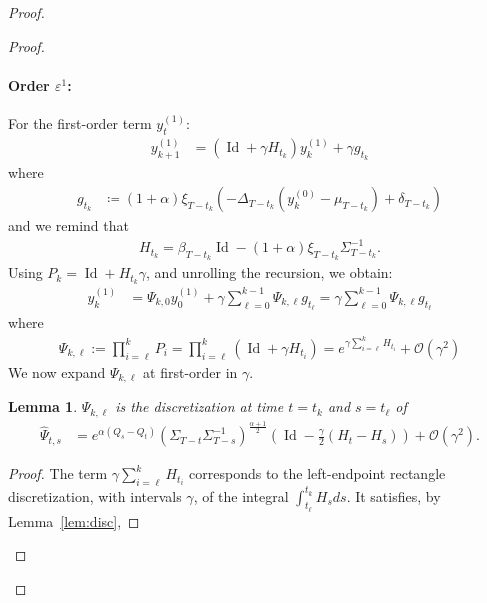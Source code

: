 \documentclass[11pt]{article}
\newtheorem{lem}{Lemma}
\newcommand{\eqdef}{\coloneqq}
\newcommand{\id}{\operatorname{Id}}
\begin{document}
\begin{proof}
\begin{proof}
\paragraph{Order \(\varepsilon^1\):} For the first-order term $y^{(1)}_t$:
\begin{align*}
y^{(1)}_{k+1} %
&= (\id + \gamma H_{t_k}) y^{(1)}_k + \gamma g_{t_k}
\end{align*}
where 
\begin{align*}
g_{t_k} %
&\eqdef (1 + \alpha) \xi_{T-t_k}( - \Delta_{T-t_k} (y^{(0)}_k - \mu_{T-t_k}) +  \delta_{T-t_k})
\end{align*}
and we remind that 
\begin{align*}
     H_{t_k} = \beta_{T-t_k}\id - (1 + \alpha) \xi_{T-t_k} \Sigma_{T-t_k}^{-1}.
\end{align*}
Using  $P_k = \id + H_{t_k} \gamma$, and unrolling the recursion, we obtain:
\begin{align*}
    y^{(1)}_k &= \Psi_{k,0} y^{(1)}_0 + \gamma \sum_{\ell=0}^{k-1} \Psi_{k,\ell} g_{t_\ell} = \gamma \sum_{\ell=0}^{k-1} \Psi_{k,\ell} g_{t_\ell}
\end{align*}
where 
\begin{align*}
\Psi_{k,\ell} := \prod_{i=\ell}^k P_i = \prod_{i=\ell}^k (\id + \gamma H_{t_i}) =  e^{\gamma \sum_{i=\ell}^k H_{t_i}} + \mathcal{O}(\gamma^2) 
\end{align*}
We now expand $\Psi_{k,\ell}$ at first-order in $\gamma$.
\begin{lem}
$\Psi_{k,\ell}$ is the discretization at time $t = t_k$ and $s = t_\ell$ of 
\begin{align*}
\hat \Psi_{t,s} &= e^{\alpha (Q_{s} - Q_{t})} \left( \Sigma_{T-t} \Sigma_{T-s}^{-1} \right)^{\frac{\alpha + 1}{2}}(\id - \frac{\gamma}{2}(H_{t} - H_{s})) + \mathcal{O}(\gamma^2) .
\end{align*}
\end{lem}
\begin{proof}
    The term $\gamma \sum_{i=\ell}^k H_{t_i}$ corresponds to the left-endpoint rectangle discretization, with intervals $\gamma$,  of the integral $\int_{t_\ell}^{t_k} H_s ds$. It satisfies, by Lemma~\ref{lem:disc},

\end{proof}
\end{proof}
\end{proof}
\end{document}
